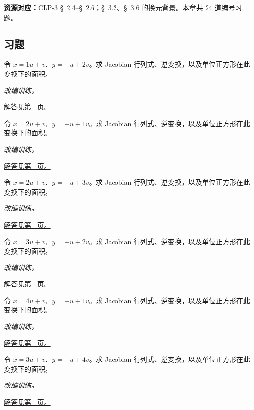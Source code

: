 \documentclass[UTF8,12pt,a4paper,fontset=fandol]{ctexart}
\begin{document}
\textbf{资源对应：}CLP-3 \S~2.4--\S~2.6；\S~3.2、\S~3.6 的换元背景。本章共 24 道编号习题。
\subsection{习题}
\begin{example}[线性换元的面积缩放]\label{ex:c33q1}
令 $x=1u+v$、$y=-u+2v$。求 Jacobian 行列式、逆变换，以及单位正方形在此变换下的面积。
\par\textit{改编训练。}\par\hyperref[ans:c33q1]{解答见第~\pageref{ans:c33q1} 页。}
\end{example}
\begin{example}[线性换元的面积缩放]\label{ex:c33q2}
令 $x=2u+v$、$y=-u+1v$。求 Jacobian 行列式、逆变换，以及单位正方形在此变换下的面积。
\par\textit{改编训练。}\par\hyperref[ans:c33q2]{解答见第~\pageref{ans:c33q2} 页。}
\end{example}
\begin{example}[线性换元的面积缩放]\label{ex:c33q3}
令 $x=2u+v$、$y=-u+3v$。求 Jacobian 行列式、逆变换，以及单位正方形在此变换下的面积。
\par\textit{改编训练。}\par\hyperref[ans:c33q3]{解答见第~\pageref{ans:c33q3} 页。}
\end{example}
\begin{example}[线性换元的面积缩放]\label{ex:c33q4}
令 $x=3u+v$、$y=-u+2v$。求 Jacobian 行列式、逆变换，以及单位正方形在此变换下的面积。
\par\textit{改编训练。}\par\hyperref[ans:c33q4]{解答见第~\pageref{ans:c33q4} 页。}
\end{example}
\begin{example}[线性换元的面积缩放]\label{ex:c33q5}
令 $x=4u+v$、$y=-u+1v$。求 Jacobian 行列式、逆变换，以及单位正方形在此变换下的面积。
\par\textit{改编训练。}\par\hyperref[ans:c33q5]{解答见第~\pageref{ans:c33q5} 页。}
\end{example}
\begin{example}[线性换元的面积缩放]\label{ex:c33q6}
令 $x=3u+v$、$y=-u+4v$。求 Jacobian 行列式、逆变换，以及单位正方形在此变换下的面积。
\par\textit{改编训练。}\par\hyperref[ans:c33q6]{解答见第~\pageref{ans:c33q6} 页。}
\end{example}
\end{document}
